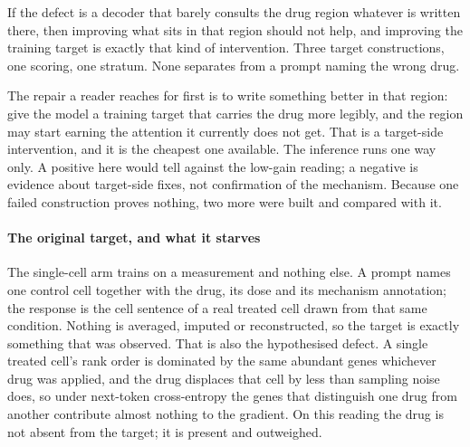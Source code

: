 
\begin{question}[4]
If the defect is a decoder that barely consults the drug region whatever is
written there, then improving what sits in that region should not help, and
improving the training target is exactly that kind of intervention. Three
target constructions, one scoring, one stratum. None separates from a prompt
naming the wrong drug.
\end{question}

\noindent
The repair a reader reaches for first is to write something better in that region: give the
model a training target that carries the drug more legibly, and the region may
start earning the attention it currently does not get. That is a target-side
intervention, and it is the cheapest one available. The inference runs one way
only. A positive here would tell against the low-gain reading; a negative is
evidence about target-side fixes, not confirmation of the mechanism. Because one
failed construction proves nothing, two more were built and compared with it.

\paragraph{The original target, and what it starves} The single-cell arm trains
on a measurement and nothing else. A prompt names one control cell together with
the drug, its dose and its mechanism annotation; the response is the cell
sentence of a real treated cell drawn from that same condition. Nothing is
averaged, imputed or reconstructed, so the target is exactly something that was
observed. That is also the hypothesised defect. A single treated cell's rank
order is dominated by the same abundant genes whichever drug was applied, and the
drug displaces that cell by less than sampling noise does, so under next-token
cross-entropy the genes that distinguish one drug from another contribute almost
nothing to the gradient. On this reading the drug is not absent from the target;
it is present and outweighed.

